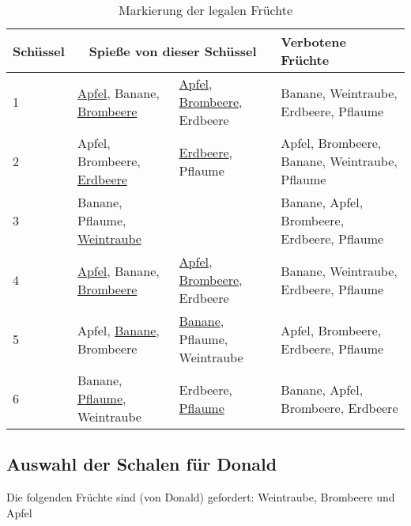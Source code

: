\documentclass[a4paper,10pt,ngerman]{scrartcl}
\begin{document}
\begin{table}[h!t]
    \begin{center}
        \begin{tabularx}{\linewidth}{l|X|X|X}
            \textbf{Schüssel} & \multicolumn{2}{c|}{\textbf{Spieße von dieser Schüssel}} & \textbf{Verbotene Früchte}                                                                         \\
            \midrule
            1                 & \underline{Apfel}, Banane, \underline{Brombeere}         & \underline{Apfel}, \underline{Brombeere}, Erdbeere & Banane, Weintraube, Erdbeere, Pflaume         \\
            \midrule
            2                 & Apfel, Brombeere, \underline{Erdbeere}                   & \underline{Erdbeere}, Pflaume                      & Apfel, Brombeere, Banane, Weintraube, Pflaume \\
            \midrule
            3                 & Banane, Pflaume, \underline{Weintraube}                  &                                                    & Banane, Apfel, Brombeere, Erdbeere, Pflaume   \\
            \midrule
            4                 & \underline{Apfel}, Banane, \underline{Brombeere}         & \underline{Apfel}, \underline{Brombeere}, Erdbeere & Banane, Weintraube, Erdbeere, Pflaume         \\
            \midrule
            5                 & Apfel, \underline{Banane}, Brombeere                     & \underline{Banane}, Pflaume, Weintraube            & Apfel, Brombeere, Erdbeere, Pflaume           \\
            \midrule
            6                 & Banane, \underline{Pflaume}, Weintraube                  & Erdbeere, \underline{Pflaume}                      & Banane, Apfel, Brombeere, Erdbeere
        \end{tabularx}
        \caption{Markierung der legalen Früchte}
        \label{tab:alle_Schüsseln_legal}
    \end{center}
\end{table}


\subsection{Auswahl der Schalen für Donald}
Die folgenden Früchte sind (von Donald) gefordert: Weintraube, Brombeere und Apfel
\end{document}
